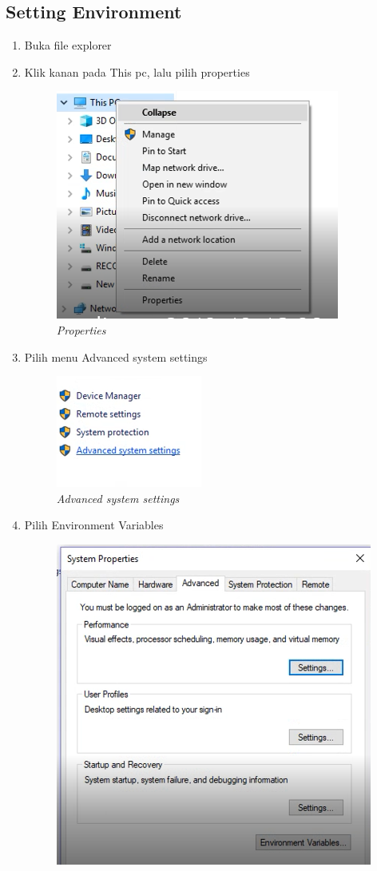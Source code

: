 \subsection{Setting Environment}
\begin{enumerate}
\item Buka file explorer
\item Klik kanan pada This pc, lalu pilih properties
\begin{figure}[H]
    \centering
    \includegraphics[scale=0.7]{figures/properties}
    \caption{\textit{Properties}}
    \label{Environment1}
\end{figure}
\item Pilih menu Advanced system settings
\begin{figure}[H]
    \centering
    \includegraphics[scale=0.7]{figures/advanced}
    \caption{\textit{Advanced system settings}}
    \label{Environment2}
\end{figure}
\item Pilih Environment Variables
\begin{figure}[H]
    \centering
    \includegraphics[scale=0.7]{figures/environment}

\end{figure}
\end{enumerate}
